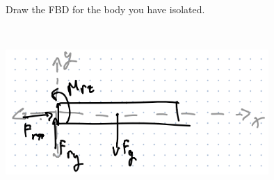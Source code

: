 Draw the FBD for the body you have isolated.

\begin{solution}\
    \begin{center}
        \includegraphics[width=0.75\textwidth]{img/e5p2.png}
    \end{center}
\end{solution}